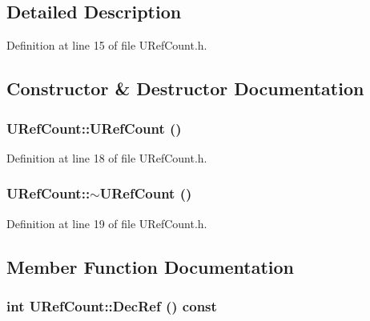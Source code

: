 \subsection{Detailed Description}


Definition at line 15 of file URefCount.h.

\subsection{Constructor \& Destructor Documentation}
\hypertarget{class_u_ref_count_5af4273c0844affa228bfdcf8e3ca554}{
\subsubsection[{URefCount}]{\setlength{\rightskip}{0pt plus 5cm}URefCount::URefCount ()}}
\label{class_u_ref_count_5af4273c0844affa228bfdcf8e3ca554}




Definition at line 18 of file URefCount.h.\hypertarget{class_u_ref_count_2d62e46289b66ca9449d5e2cd6917991}{
\subsubsection[{$\sim$URefCount}]{\setlength{\rightskip}{0pt plus 5cm}URefCount::$\sim$URefCount ()}}
\label{class_u_ref_count_2d62e46289b66ca9449d5e2cd6917991}




Definition at line 19 of file URefCount.h.

\subsection{Member Function Documentation}
\hypertarget{class_u_ref_count_81598a750fb88c7ed7870f9b9e052c21}{
\subsubsection[{DecRef}]{\setlength{\rightskip}{0pt plus 5cm}int URefCount::DecRef () const}}
\label{class_u_ref_count_81598a750fb88c7ed7870f9b9e052c21}




